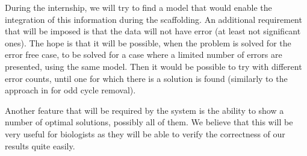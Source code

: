\documentclass[11pt]{article}
\begin{document}
During the internship, we will try to find a model that would enable the
integration of this information during the scaffolding. An additional
requirement that will be imposed is that the data will not have error (at least
not significant ones). The hope is that it will be possible, when the problem is
solved for the error free case, to be solved for a case where a limited number
of errors are presented, using the same model. Then it would be possible to try
with different error counts, until one for which there is a solution is found
(similarly to the approach in \cite{SCARPA} for odd cycle removal).

Another feature that will be required by the system is the ability to
show a number of optimal solutions, possibly all of them. We believe that this
will be very useful for biologists as they will be able to verify the
correctness of our results quite easily.
\end{document}
